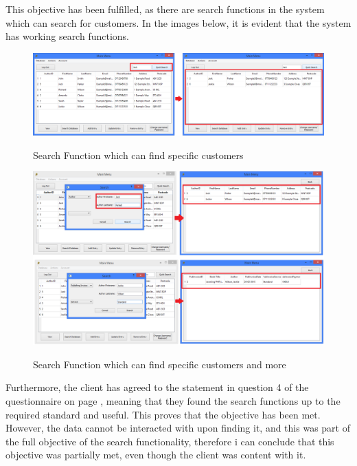 This objective has been fulfilled, as there are search functions in the system which can search for customers. In the images below, it is evident that the system has working search functions.

\begin{figure}[H]
    \includegraphics[width=\textwidth]{./Evaluation/Evidence/QuickSearch.png}
    \label{fig:QuickSearchFunction} \caption{Search Function which can find specific customers}
\end{figure}

\begin{figure}[H]
    \includegraphics[width=\textwidth]{./Evaluation/Evidence/Search.png}
    \label{fig:SearchDBFunction} \caption{Search Function which can find specific customers and more}
\end{figure}

Furthermore, the client has agreed to the statement in question 4 of the questionnaire on page \pageref{fig:QuestionnairePage1}, meaning that they found the search functions up to the required standard and useful. This proves that the objective has been met. However, the data cannot be interacted with upon finding it, and this was part of the full objective of the search functionality, therefore i can conclude that this objective was partially met, even though the client was content with it.

\

